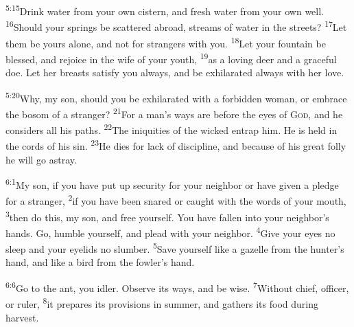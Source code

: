 \documentclass[openany,12pt,english]{book}
\newenvironment{para}{\par\pretolerance=100\tolerance=200\setlength{\emergencystretch}{0.6em}\relax}{\par}
\begin{document}
\begin{para}
    \textsuperscript{5:15}\thinspace{}Drink wa\-ter from your own cis\-tern, and fresh wa\-ter from your own well.
    \textsuperscript{16}\thinspace{}Should your springs be scattered a\-broad, streams of wa\-ter in the streets?
    \textsuperscript{17}\thinspace{}Let them be yours a\-lone, and not for strangers with you.
    \textsuperscript{18}\thinspace{}Let your foun\-tain be bless\-ed, and re\-joice in the wife of your youth,
    \textsuperscript{19}\thinspace{}as a lov\-ing deer and a grace\-ful doe. Let her breasts sat\-is\-fy you al\-ways, and be ex\-hil\-a\-rat\-ed al\-ways with her love.
\end{para}

\begin{para}
    \textsuperscript{5:20}\thinspace{}Why, my son, should you be ex\-hil\-a\-rat\-ed with a for\-bid\-den wom\-an, or em\-brace the bos\-om of a strang\-er?
    \textsuperscript{21}\thinspace{}For a man's ways are be\-fore the eyes of \textsc{God}, and he considers all his paths.
    \textsuperscript{22}\thinspace{}The iniquities of the wick\-ed en\-trap him. He is held in the cords of his sin.
    \textsuperscript{23}\thinspace{}He dies for lack of dis\-ci\-pline, and be\-cause of his great fol\-ly he will go a\-stray.
\end{para}

\bigskip{}

\begin{para}
    \textsuperscript{6:1}\thinspace{}My son, if you have put up se\-cu\-ri\-ty for your neigh\-bor or have giv\-en a pledge for a strang\-er,
    \textsuperscript{2}\thinspace{}if you have been snared or caught with the words of your mouth,
    \textsuperscript{3}\thinspace{}then do this, my son, and free your\-self. You have fall\-en in\-to your neighbor's hands. Go, hum\-ble your\-self, and plead with your neigh\-bor.
    \textsuperscript{4}\thinspace{}Give your eyes no sleep and your eyelids no slum\-ber.
    \textsuperscript{5}\thinspace{}Save your\-self like a ga\-zelle from the hunter's hand, and like a bird from the fowler's hand.
\end{para}

\begin{para}
    \textsuperscript{6:6}\thinspace{}Go to the ant, you i\-dler. Ob\-serve its ways, and be wise.
    \textsuperscript{7}\thinspace{}With\-out chief, of\-fic\-er, or rul\-er,
    \textsuperscript{8}\thinspace{}it prepares its provisions in sum\-mer, and gathers its food dur\-ing har\-vest.
\end{para}
\end{document}
